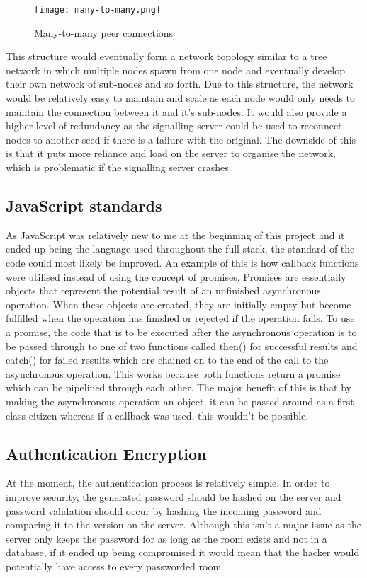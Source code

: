 \documentclass[]{report}
\begin{document}
			\begin{figure}[H]
				\caption{Many-to-many peer connections}
				\centering
				\texttt{[image: many-to-many.png]}
			\end{figure}	
			
			This structure would eventually form a network topology similar to a tree network in which multiple nodes spawn from one node and eventually develop their own network of sub-nodes and so forth. Due to this structure, the network would be relatively easy to maintain and scale as each node would only needs to maintain the connection between it and it's sub-nodes. It would also provide a higher level of redundancy as the signalling server could be used to reconnect nodes to another seed if there is a failure with the original. The downside of this is that it puts more reliance and load on the server to organise the network, which is problematic if the signalling server crashes.
			
			\subsection{JavaScript standards}
			As JavaScript was relatively new to me at the beginning of this project and it ended up being the language used throughout the full stack, the standard of the code could most likely be improved. An example of this is how callback functions were utilised instead of using the concept of promises. Promises are essentially objects that represent the potential result of an unfinished asynchronous operation. When these objects are created, they are initially empty but become fulfilled when the operation has finished or rejected if the operation fails. To use a promise, the code that is to be executed after the asynchronous operation is to be passed through to one of two functions called then() for successful results and catch() for failed results which are chained on to the end of the call to the asynchronous operation. This works because both functions return a promise which can be pipelined through each other. The major benefit of this is that by making the asynchronous operation an object, it can be passed around as a first class citizen whereas if a callback was used, this wouldn't be possible.	

			\subsection{Authentication Encryption}
			At the moment, the authentication process is relatively simple. In order to improve security, the generated password should be hashed on the server and password validation should occur by hashing the incoming password and comparing it to the version on the server. Although this isn't a major issue as the server only keeps the password for as long as the room exists and not in a database, if it ended up being compromised it would mean that the hacker would potentially have access to every passworded room. 
			
\end{document}
